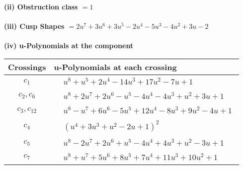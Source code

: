 \documentclass[1p]{elsarticle_modified}
\theoremstyle{definition}
\begin{document}
\flushleft \textbf{(ii) Obstruction class $= 1$}\\~\\
\flushleft \textbf{(iii) Cusp Shapes $= 2 u^7+3 u^6+3 u^5-2 u^4-5 u^3-4 u^2+3 u-2$}\\~\\
\newpage\renewcommand{\arraystretch}{1}
\flushleft \textbf{(iv) u-Polynomials at the component}\newline \\
\begin{tabular}{m{50pt}|m{274pt}}
Crossings & \hspace{64pt}u-Polynomials at each crossing \\
\hline $$\begin{aligned}c_{1}\end{aligned}$$&$\begin{aligned}
&u^8+u^5+2 u^4-14 u^3+17 u^2-7 u+1
\end{aligned}$\\
\hline $$\begin{aligned}c_{2},c_{6}\end{aligned}$$&$\begin{aligned}
&u^8+2 u^7+2 u^6- u^5-4 u^4-4 u^3+u^2+3 u+1
\end{aligned}$\\
\hline $$\begin{aligned}c_{3},c_{12}\end{aligned}$$&$\begin{aligned}
&u^8- u^7+6 u^6-5 u^5+12 u^4-8 u^3+9 u^2-4 u+1
\end{aligned}$\\
\hline $$\begin{aligned}c_{4}\end{aligned}$$&$\begin{aligned}
&(u^4+3 u^3+u^2-2 u+1)^2
\end{aligned}$\\
\hline $$\begin{aligned}c_{5}\end{aligned}$$&$\begin{aligned}
&u^8-2 u^7+2 u^6+u^5-4 u^4+4 u^3+u^2-3 u+1
\end{aligned}$\\
\hline $$\begin{aligned}c_{7}\end{aligned}$$&$\begin{aligned}
&u^8+u^7+5 u^6+8 u^5+7 u^4+11 u^3+10 u^2+1
\end{aligned}$\\

\end{tabular}
\end{document}
